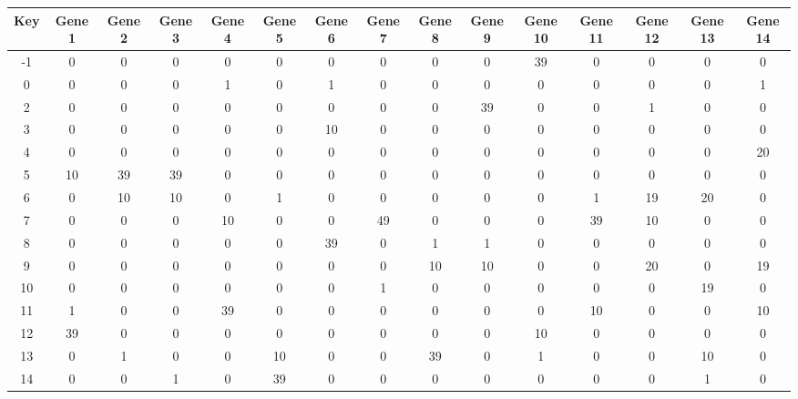 \begin{tabular}{|c|c|c|c|c|c|c|c|c|c|c|c|c|c|c|}
\hline
Key & Gene 1 & Gene 2 & Gene 3 & Gene 4 & Gene 5 & Gene 6 & Gene 7 & Gene 8 & Gene 9 & Gene 10 & Gene 11 & Gene 12 & Gene 13 & Gene 14 \\
\hline
-1 & 0 & 0 & 0 & 0 & 0 & 0 & 0 & 0 & 0 & 39 & 0 & 0 & 0 & 0 \\
0 & 0 & 0 & 0 & 1 & 0 & 1 & 0 & 0 & 0 & 0 & 0 & 0 & 0 & 1 \\
2 & 0 & 0 & 0 & 0 & 0 & 0 & 0 & 0 & 39 & 0 & 0 & 1 & 0 & 0 \\
3 & 0 & 0 & 0 & 0 & 0 & 10 & 0 & 0 & 0 & 0 & 0 & 0 & 0 & 0 \\
4 & 0 & 0 & 0 & 0 & 0 & 0 & 0 & 0 & 0 & 0 & 0 & 0 & 0 & 20 \\
5 & 10 & 39 & 39 & 0 & 0 & 0 & 0 & 0 & 0 & 0 & 0 & 0 & 0 & 0 \\
6 & 0 & 10 & 10 & 0 & 1 & 0 & 0 & 0 & 0 & 0 & 1 & 19 & 20 & 0 \\
7 & 0 & 0 & 0 & 10 & 0 & 0 & 49 & 0 & 0 & 0 & 39 & 10 & 0 & 0 \\
8 & 0 & 0 & 0 & 0 & 0 & 39 & 0 & 1 & 1 & 0 & 0 & 0 & 0 & 0 \\
9 & 0 & 0 & 0 & 0 & 0 & 0 & 0 & 10 & 10 & 0 & 0 & 20 & 0 & 19 \\
10 & 0 & 0 & 0 & 0 & 0 & 0 & 1 & 0 & 0 & 0 & 0 & 0 & 19 & 0 \\
11 & 1 & 0 & 0 & 39 & 0 & 0 & 0 & 0 & 0 & 0 & 10 & 0 & 0 & 10 \\
12 & 39 & 0 & 0 & 0 & 0 & 0 & 0 & 0 & 0 & 10 & 0 & 0 & 0 & 0 \\
13 & 0 & 1 & 0 & 0 & 10 & 0 & 0 & 39 & 0 & 1 & 0 & 0 & 10 & 0 \\
14 & 0 & 0 & 1 & 0 & 39 & 0 & 0 & 0 & 0 & 0 & 0 & 0 & 1 & 0 \\
\hline
\end{tabular}